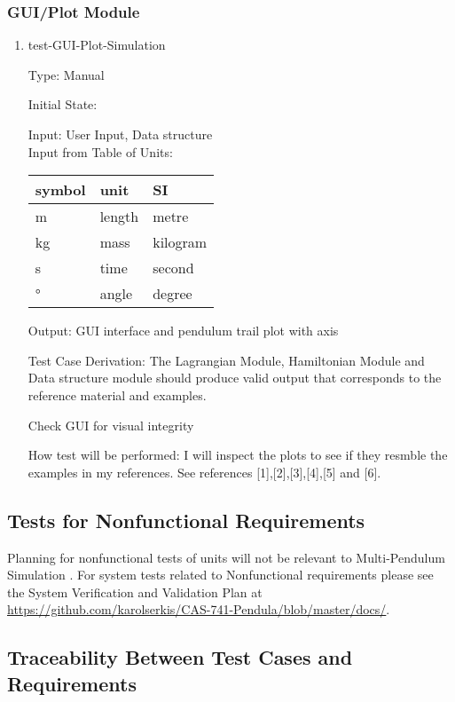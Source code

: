 \documentclass[12pt, titlepage]{article}
\newcommand{\progname}{Multi-Pendulum Simulation }
\begin{document}
\subsubsection{GUI/Plot Module} 

\begin{enumerate}				
	\item{test-GUI-Plot-Simulation\\}
	
	Type: Manual
	
	Initial State: 
	
	Input: User Input, Data structure\\
	Input from Table of Units:\\
  \noindent \begin{tabular}{l l l} 
    \toprule		
    \textbf{symbol} & \textbf{unit} & \textbf{SI}\\
    \midrule 
    \si{\metre} & length & metre\\
    \si{\kilogram} & mass & kilogram\\
    \si{\second} & time & second\\
    \si{\degree} & angle & degree\\
    \bottomrule
  \end{tabular}
	
	Output: GUI interface and pendulum trail plot with axis
	
	Test Case Derivation: The Lagrangian Module, Hamiltonian Module and Data structure module should produce valid
	output that corresponds to the reference material and examples.
	
	Check GUI for visual integrity
	
	How test will be performed: I will inspect the plots to see if 
	they resmble the examples in my references. See references [1],[2],[3],[4],[5] and [6].
\end{enumerate} 

\subsection{Tests for Nonfunctional Requirements}

Planning for nonfunctional tests of units will not be relevant to \progname. 
For system tests related to Nonfunctional requirements please see the System 
Verification and Validation Plan at 
\url{https://github.com/karolserkis/CAS-741-Pendula/blob/master/docs/}. 

\subsection{Traceability Between Test Cases and Requirements}
\end{document}
